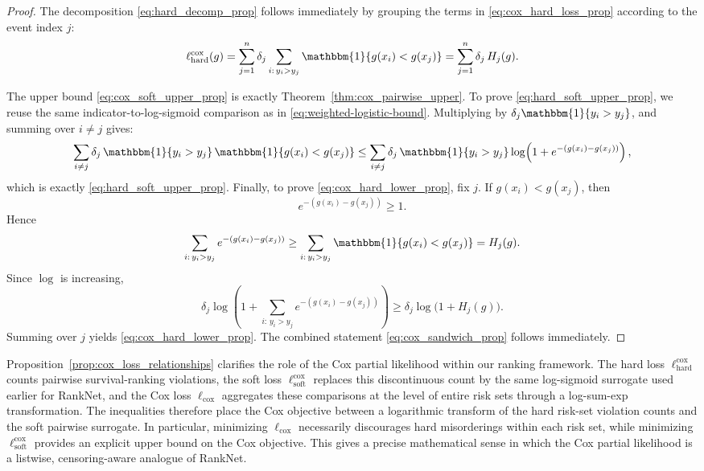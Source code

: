\documentclass[11pt]{article}
\theoremstyle{plain}
\theoremstyle{plain}
\theoremstyle{plain}
\theoremstyle{plain}
\theoremstyle{plain}
\theoremstyle{plain}
\theoremstyle{plain}
\begin{document}
\begin{proof}
The decomposition \eqref{eq:hard_decomp_prop} follows immediately by grouping the terms in \eqref{eq:cox_hard_loss_prop} according to the event index \(j\):
\[
\ell_{\mathrm{hard}}^{\mathrm{cox}}(g)
=
\sum_{j=1}^n
\delta_j
\sum_{i:\,y_i>y_j}\mathbbm{1}\{g(x_i)<g(x_j)\}
=
\sum_{j=1}^n \delta_j\,H_j(g).
\]

The upper bound \eqref{eq:cox_soft_upper_prop} is exactly Theorem~\ref{thm:cox_pairwise_upper}. To prove \eqref{eq:hard_soft_upper_prop}, we reuse the same indicator-to-log-sigmoid comparison as in \eqref{eq:weighted-logistic-bound}. Multiplying by \(\delta_j\mathbbm{1}\{y_i>y_j\}\), and summing over \(i\ne j\) gives:
\[
\sum_{i\ne j}
\delta_j\,\mathbbm{1}\{y_i>y_j\}\,\mathbbm{1}\{g(x_i)<g(x_j)\}
\le
\sum_{i\ne j}
\delta_j\,\mathbbm{1}\{y_i>y_j\}
\log\!\left(1+e^{-(g(x_i)-g(x_j))}\right),
\]
which is exactly \eqref{eq:hard_soft_upper_prop}. Finally, to prove \eqref{eq:cox_hard_lower_prop}, fix \(j\). If \(g(x_i)<g(x_j)\), then
\[
e^{-(g(x_i)-g(x_j))}\ge 1.
\]
Hence
\[
\sum_{i:\,y_i>y_j} e^{-(g(x_i)-g(x_j))}
\ge
\sum_{i:\,y_i>y_j}\mathbbm{1}\{g(x_i)<g(x_j)\}
=
H_j(g).
\]
Since \(\log\) is increasing,
\[
\delta_j
\log\!\left(
1+\sum_{i:\,y_i>y_j} e^{-(g(x_i)-g(x_j))}
\right)
\ge
\delta_j \log\!\big(1+H_j(g)\big).
\]
Summing over \(j\) yields \eqref{eq:cox_hard_lower_prop}. The combined statement \eqref{eq:cox_sandwich_prop} follows immediately.
\end{proof}

Proposition~\ref{prop:cox_loss_relationships} clarifies the role of the Cox partial likelihood within our ranking framework. The hard loss \(\ell_{\mathrm{hard}}^{\mathrm{cox}}\) counts pairwise survival-ranking violations, the soft loss \(\ell_{\mathrm{soft}}^{\mathrm{cox}}\) replaces this discontinuous count by the same log-sigmoid surrogate used earlier for RankNet, and the Cox loss \(\ell_{\mathrm{cox}}\) aggregates these comparisons at the level of entire risk sets through a log-sum-exp transformation. The inequalities therefore place the Cox objective between a logarithmic transform of the hard risk-set violation counts and the soft pairwise surrogate. In particular, minimizing \(\ell_{\mathrm{cox}}\) necessarily discourages hard misorderings within each risk set, while minimizing \(\ell_{\mathrm{soft}}^{\mathrm{cox}}\) provides an explicit upper bound on the Cox objective. This gives a precise mathematical sense in which the Cox partial likelihood is a listwise, censoring-aware analogue of RankNet.
\end{document}
